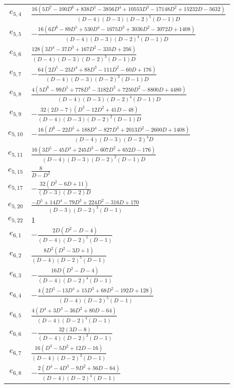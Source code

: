 \documentclass[a4paper,11pt]{article}
\begin{document}
\begin{longtable}{|c|l|}
    $e_{5, 4}$ & $\frac{16 \left(5 D^7-100 D^6+838 D^5-3856 D^4+10553 D^3-17148 D^2+15232 D-5632\right)}{(D-4) (D-3) (D-2)^5 (D-1) D}$ \\
    $e_{5, 5}$ & $-\frac{16 \left(6 D^6-89 D^5+530 D^4-1675 D^3+3036 D^2-3072 D+1408\right)}{(D-4) (D-3) (D-2)^4 (D-1) D}$ \\
    $e_{5, 6}$ & $\frac{128 \left(3 D^4-37 D^3+167 D^2-335 D+256\right)}{(D-4) (D-3) (D-2)^3 (D-1) D}$ \\
    $e_{5, 7}$ & $-\frac{64 \left(2 D^5-23 D^4+88 D^3-111 D^2-60 D+176\right)}{(D-4) (D-3) (D-2)^3 (D-1) D}$ \\
    $e_{5, 8}$ & $\frac{4 \left(5 D^6-99 D^5+778 D^4-3182 D^3+7250 D^2-8800 D+4480\right)}{(D-4) (D-3) (D-2)^4 (D-1) D}$ \\
    $e_{5, 9}$ & $-\frac{32 (2 D-7) \left(D^3-12 D^2+41 D-48\right)}{(D-4) (D-3) (D-2)^2 (D-1) D}$ \\
    $e_{5, 10}$ & $-\frac{16 \left(D^6-22 D^5+188 D^4-827 D^3+2013 D^2-2600 D+1408\right)}{(D-4) (D-3) (D-2)^4 D}$ \\
    $e_{5, 11}$ & $\frac{16 \left(3 D^5-45 D^4+245 D^3-607 D^2+652 D-176\right)}{(D-4) (D-3) (D-2)^2 (D-1) D}$ \\
    $e_{5, 15}$ & $\frac{8}{D-D^2}$ \\
    $e_{5, 17}$ & $-\frac{32 \left(D^2-6 D+11\right)}{(D-3) (D-2) D}$ \\
    $e_{5, 20}$ & $\frac{-D^5+14 D^4-79 D^3+224 D^2-316 D+170}{(D-3) (D-2)^3 (D-1)}$ \\
    $e_{5, 22}$ & $1$ \\
    \hline
    $e_{6, 1}$ & $-\frac{2 D \left(D^2-D-4\right)}{(D-4) (D-2)^5 (D-1)}$ \\
    $e_{6, 2}$ & $\frac{8 D^2 \left(D^2-3 D+1\right)}{(D-4) (D-2)^5 (D-1)}$ \\
    $e_{6, 3}$ & $-\frac{16 D \left(D^2-D-4\right)}{(D-4) (D-2)^4 (D-1)}$ \\
    $e_{6, 4}$ & $-\frac{4 \left(2 D^5-13 D^4+15 D^3+68 D^2-192 D+128\right)}{(D-4) (D-2)^5 (D-1)}$ \\
    $e_{6, 5}$ & $\frac{4 \left(D^4+3 D^3-36 D^2+80 D-64\right)}{(D-4) (D-2)^4 (D-1)}$ \\
    $e_{6, 6}$ & $-\frac{32 (3 D-8)}{(D-4) (D-2)^3 (D-1)}$ \\
    $e_{6, 7}$ & $\frac{16 \left(D^3-5 D^2+12 D-16\right)}{(D-4) (D-2)^3 (D-1)}$ \\
    $e_{6, 8}$ & $-\frac{2 \left(D^4-4 D^3-9 D^2+56 D-64\right)}{(D-4) (D-2)^4 (D-1)}$ \\

\end{longtable}
\end{document}
